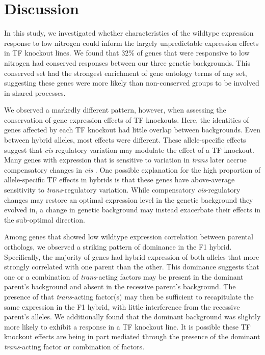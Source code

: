 \section{Discussion}

In this study, we investigated whether characteristics of the wildtype expression response to low nitrogen could inform the largely unpredictable expression effects in TF knockout lines. We found that 32\% of genes that were responsive to low nitrogen had conserved responses between our three genetic backgrounds. This conserved set had the strongest enrichment of gene ontology terms of any set, suggesting these genes were more likely than non-conserved groups to be involved in shared processes.

We observed a markedly different pattern, however, when assessing the conservation of gene expression effects of TF knockouts. Here, the identities of genes affected by each TF knockout had little overlap between backgrounds. Even between hybrid alleles, most effects were different. These allele-specific effects suggest that \textit{cis}-regulatory variation may modulate the effect of a TF knockout. Many genes with expression that is sensitive to variation in \textit{trans} later accrue compensatory changes in \textit{cis} \cite{Metzger2017, Metzger2019, Tsouris2024}. One possible explanation for the high proportion of allele-specific TF effects in hybrids is that these genes have above-average sensitivity to \textit{trans}-regulatory variation. While compensatory \textit{cis}-regulatory changes may restore an optimal expression level in the genetic background they evolved in, a change in genetic background may instead exacerbate their effects in the sub-optimal direction.

Among genes that showed low wildtype expression correlation between parental orthologs, we observed a striking pattern of dominance in the F1 hybrid. Specifically, the majority of genes had hybrid expression of both alleles that more strongly correlated with one parent than the other. This dominance suggests that one or a combination of \textit{trans}-acting factors may be present in the dominant parent's background and absent in the recessive parent's background. The presence of that \textit{trans}-acting factor(s) may then be sufficient to recapitulate the same expression in the F1 hybrid, with little interference from the recessive parent's alleles. We additionally found that the dominant background was slightly more likely to exhibit a response in a TF knockout line. It is possible these TF knockout effects are being in part mediated through the presence of the dominant \textit{trans}-acting factor or combination of factors.

